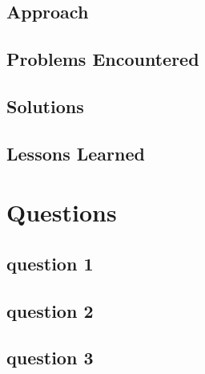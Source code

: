 \documentclass[11pt]{article}
\begin{document}
\subsection*{Approach}
\subsection*{Problems Encountered}
\subsection*{Solutions}
\subsection*{Lessons Learned}

\section*{Questions}
\subsection*{question 1}
\subsection*{question 2}
\subsection*{question 3}
\end{document}

